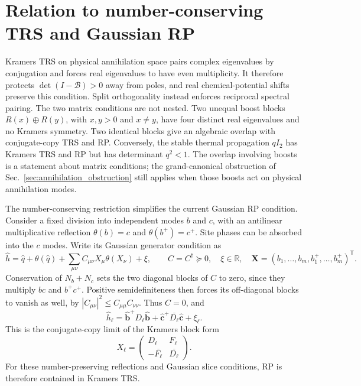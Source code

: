 \documentclass[11pt,a4paper]{article}
\newcommand{\trans}{\mathsf{T}}
\newcommand{\mc}[1]{\mathcal{#1}}
\newcommand{\bb}[1]{\bm{#1}}
\begin{document}
\section{Relation to number-conserving TRS and Gaussian RP}

Kramers TRS on physical annihilation space pairs complex eigenvalues by
conjugation and forces real eigenvalues to have even multiplicity.
It therefore protects $\det(I-\mc B)>0$ away from poles, and real
chemical-potential shifts preserve this condition. Split orthogonality
instead enforces reciprocal spectral pairing. The two matrix conditions
are not nested. Two unequal boost blocks $R(x)\oplus R(y)$, with
$x,y>0$ and $x\ne y$, have four distinct real eigenvalues and no Kramers
symmetry. Two identical blocks give an algebraic overlap with
conjugate-copy TRS and RP. Conversely, the stable thermal propagation
$qI_2$ has Kramers TRS and RP but has determinant $q^2<1$.
The overlap involving boosts is a statement about matrix conditions;
the grand-canonical obstruction of Sec.~\ref{sec:annihilation_obstruction} still applies when those
boosts act on physical annihilation modes.

The number-conserving restriction simplifies the current Gaussian RP
condition. Consider a fixed division into independent modes $b$ and $c$,
with an antilinear multiplicative reflection $\theta(b)=c$ and
$\theta(b^{+})=c^{+}$. Site phases can be absorbed into the $c$ modes.
Write its Gaussian generator condition as
\begin{equation}
    \hat h=\hat q+\theta(\hat q)
       +\sum_{\mu\nu}C_{\mu\nu}X_\mu\theta(X_\nu)+\xi,
    \qquad
    C=C^\dagger\succeq0,\quad \xi\in\mathbb R,
    \quad
    \bb X=(b_1,\ldots,b_m,b_1^{+},\ldots,b_m^{+})^\trans .
    \label{eq:rp_condition}
\end{equation}
Conservation of $N_b+N_c$ sets the two diagonal blocks of $C$ to zero,
since they multiply $bc$ and $b^{+}c^{+}$. Positive semidefiniteness
then forces its off-diagonal blocks to vanish as well, by
$|C_{\mu\nu}|^2\le C_{\mu\mu}C_{\nu\nu}$. Thus $C=0$, and
\begin{equation}
    \hat h_\ell=
       \hat{\bb b}^{+}D_\ell\hat{\bb b}
       +\hat{\bb c}^{+}\overline{D_\ell}\hat{\bb c}+\xi_\ell .
    \label{eq:rp_number}
\end{equation}
This is the conjugate-copy limit of the Kramers block form
\begin{equation}
    X_\ell=
    \begin{pmatrix}D_\ell&F_\ell\\
    -\overline{F_\ell}&\overline{D_\ell}\end{pmatrix}.
    \label{eq:kramers_block}
\end{equation}
For these number-preserving reflections and Gaussian slice conditions,
RP is therefore contained in Kramers TRS.
\end{document}
